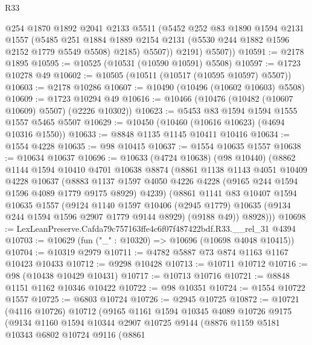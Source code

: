 \begin{lexlean}{R33}
\begin{coremodule}
            @254
            @1870
            @1892
            @2041
            @2133
            @5511
            (@5452
              @252
              @83
              @1890
              @1594
              @2131
              @1557
              (@5485
                @251
                @1884
                @1889
                @2154
                @2131
                (@5530 @244 @1882 @1596 @2152 @1779 @5549 @5508)
                @2185)
              @5507))
          @2191)
        @5507))
@10591 := @2178 @1895
@10595 := @10525 (@10531 (@10590 @10591) @5508)
@10597 := @1723 @10278 @49
@10602 := @10505 (@10511 (@10517 (@10595 @10597) @5507))
@10603 := @2178 @10286
@10607 := @10490 (@10496 (@10602 @10603) @5508)
@10609 := @1723 @10294 @49
@10616 := @10466 (@10476 (@10482 (@10607 @10609) @5507) (@2226 @10302))
@10623 := @5453 @83 @1594 @1594 @1555 @1557 @5465 @5507
@10629 := @10450 (@10460 (@10616 @10623) (@4694 @10316 @1550))
@10633 := @8848 @1135 @1145 @10411 @10416
@10634 := @1554 @4228
@10635 := @98 @10415
@10637 := @1554 @10635 @1557
@10638 := @10634 @10637
@10696 := @10633
    (@4724 @10638)
    (@98 @10440)
    (@8862
      @1144
      @1594
      @10410
      @4701
      @10638
      @8874
      (@8861
        @1138
        @1143
        @4051
        @10409
        @4228
        @10637
        (@8883 @1137 @1597 @4050 @4226 @4228 (@9165 @244 @1594 @1596 @4089 @1779 @9175 @8929) @4239)
        (@8861
          @1141
          @83
          @10407
          @1594
          @10635
          @1557
          (@9124
            @1140
            @1597
            @10406
            (@2945 @1779)
            @10635
            (@9134 @244 @1594 @1596 @2907 @1779 @9144 @8929)
            (@9188 @49))
          @8928)))
@10698 := LexLeanPreserve.Cafda79c757163ffe4c6f07f487422bdf.R33.__rel_31 @4394
@10703 := @10629 (fun ("_" : @10320) => @10696 (@10698 @4048 @10415))
@10704 := @10319 @2979
@10711 := @4782 @5887 @73 @874 @1163 @1167 @10423 @10433
@10712 := @9298 @10428
@10713 := @10711 @10712
@10716 := @98 (@10438 @10429 @10431)
@10717 := @10713 @10716
@10721 := @8848 @1151 @1162 @10346 @10422
@10722 := @98 @10351
@10724 := @1554 @10722 @1557
@10725 := @6803 @10724
@10726 := @2945 @10725
@10872 := @10721
    (@4116 @10726)
    @10712
    (@9165
      @1161
      @1594
      @10345
      @4089
      @10726
      @9175
      (@9134
        @1160
        @1594
        @10344
        @2907
        @10725
        @9144
        (@8876
          @1159
          @5181
          @10343
          @6802
          @10724
          @9116
          (@8861

\end{coremodule}
\end{lexlean}
